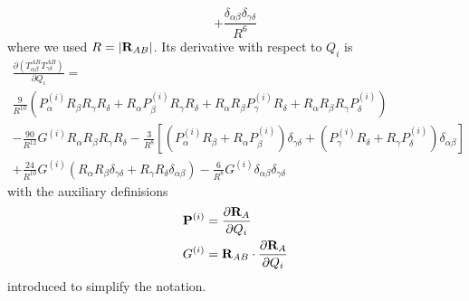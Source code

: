 \documentclass[b5paper,oneside,fleqn,11pt]{book}
\newcommand{\fderiv}[2]{\ensuremath{
    \frac{\partial #1}{\partial #2}}}
\begin{document}
\begin{refsection}
\begin{equation}
 + \frac{\delta_{\alpha\beta}\delta_{\gamma\delta}}{R^6}
\end{equation}
%
where we used $R=\left|{\bf R}_{AB}\right|$.
Its derivative with respect to $Q_i$ is
%
\begin{multline} \label{e:happylabel}
 \fderiv{\left( T^{AB}_{\alpha\beta} T^{AB}_{\gamma\delta} \right)}{Q_i} = \\ 
  \frac{9}{R^{10}} 
   \left( 
     P^{(i)}_\alpha R_\beta R_\gamma R_\delta + 
     R_\alpha P^{(i)}_\beta R_\gamma R_\delta +
     R_\alpha R_\beta P^{(i)}_\gamma R_\delta +
     R_\alpha R_\beta R_\gamma P^{(i)}_\delta
   \right) \\
    - \frac{90}{R^{12}}
       G^{(i)} R_\alpha R_\beta R_\gamma R_\delta
    - \frac{3}{R^8} 
      \left[ 
          \left( P^{(i)}_\alpha R_\beta  + R_\alpha P^{(i)}_\beta \right)\delta_{\gamma\delta}
        + \left( P^{(i)}_\gamma R_\delta + R_\gamma P^{(i)}_\delta\right)\delta_{\alpha\beta}
      \right] \\
   + \frac{24}{R^{10}} G^{(i)} 
      \left( 
       R_\alpha R_\beta  \delta_{\gamma\delta} 
     + R_\gamma R_\delta \delta_{\alpha\beta} 
      \right) 
   - \frac{6}{R^{8}} G^{(i)} \delta_{\alpha\beta}  \delta_{\gamma\delta}
\end{multline}
%
with the auxiliary definisions
%
\begin{subequations} 
 \begin{align}
   {\bf P}^{(i)} &= \fderiv{{\bf R}_A}{Q_i}                    \label{e:pi} \\
   G^{(i)}       &= {\bf R}_{AB} \cdot \fderiv{{\bf R}_A}{Q_i} \label{e:gi}
 \end{align}
\end{subequations}
%
introduced to simplify the notation.


\end{refsection}
\end{document}
